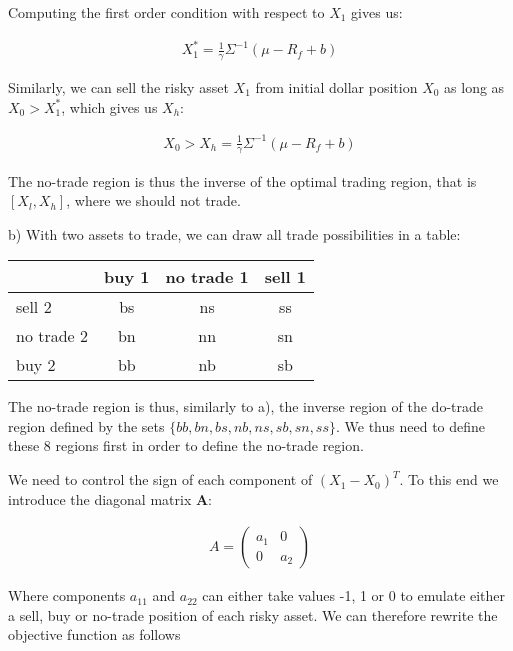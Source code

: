 \documentclass[10pt]{article}
\begin{document}
Computing the first order condition with respect to $X_1$ gives us:

\begin{align*}
	X_1^* =\frac{1}{\gamma} \Sigma^{-1} (\mu - R_f + b)
\end{align*}

Similarly, we can sell the risky asset $X_1$ from initial dollar position $X_0$ as long as $X_0 > X_1^*$, which gives us $X_h$:

\begin{align*}
	X_0 > X_h = \frac{1}{\gamma} \Sigma^{-1} (\mu - R_f + b)
\end{align*}

The no-trade region is thus the inverse of the optimal trading region, that is $[X_l, X_h]$, where we should not trade.

\bigbreak

b) With two assets to trade, we can draw all trade possibilities in a table:

\begin{center}
\begin{tabular}{|l|c|c|c|}
\hline
           & \multicolumn{1}{l|}{buy 1} & \multicolumn{1}{l|}{no trade 1} & \multicolumn{1}{l|}{sell 1} \\ \hline
sell 2      & bs  & ns & ss \\ \hline
no trade 2 & bn  & nn & sn \\ \hline
buy 2     & bb & nb & sb  \\ \hline
\end{tabular}
\end{center}

The no-trade region is thus, similarly to a), the inverse region of the do-trade region defined by the sets $\{bb, bn, bs, nb, ns, sb, sn, ss\}$. We thus need to define these 8 regions first in order to define the no-trade region.

\smallbreak

We need to control the sign of each component of $(X_1 - X_0)^T$. To this end we introduce the diagonal matrix \textbf{A}:

\begin{align*}
	A = \begin{pmatrix}
a_{1} & 0\\
0 & a_{2}
\end{pmatrix}
\end{align*}

Where components $a_{11}$ and $a_{22}$ can either take values -1, 1 or 0 to emulate either a sell, buy or no-trade position of each risky asset. We can therefore rewrite the objective function as follows
\end{document}
